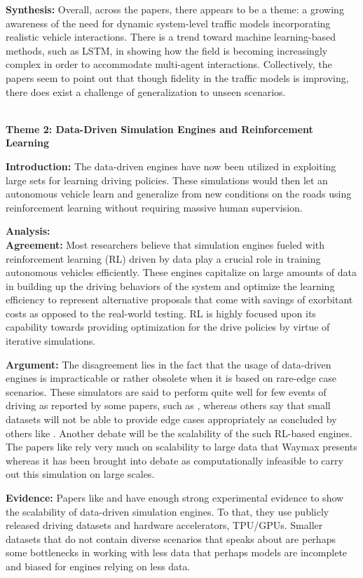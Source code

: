 \documentclass[lettersize,journal]{IEEEtran}
\newcommand{\subsubsubsection}[1]{%
    \par\medskip
    \noindent\textbf{#1}
    \par\medskip
}
\begin{document}
\textbf{Synthesis:}
Overall, across the papers, there appears to be a theme: a growing awareness of the need for dynamic system-level traffic models incorporating realistic vehicle interactions. There is a trend toward machine learning-based methods, such as LSTM, in showing how the field is becoming increasingly complex in order to accommodate multi-agent interactions. Collectively, the papers seem to point out that though fidelity in the traffic models is improving, there does exist a challenge of generalization to unseen scenarios.
\\
\\

\subsubsubsection{Theme 2: Data-Driven Simulation Engines and Reinforcement Learning}
\textbf{Introduction:}
The data-driven engines have now been utilized in exploiting large sets for learning driving policies. These simulations would then let an autonomous vehicle learn and generalize from new conditions on the roads using reinforcement learning without requiring massive human supervision.

\textbf{Analysis:}  \\
\textbf{Agreement:}
Most researchers believe that simulation engines fueled with reinforcement learning (RL) driven by data play a crucial role in training autonomous vehicles efficiently. These engines capitalize on large amounts of data in building up the driving behaviors of the system and optimize the learning efficiency to represent alternative proposals that come with savings of exorbitant costs as opposed to the real-world testing. RL is highly focused upon its capability towards providing optimization for the drive policies by virtue of iterative simulations.

\textbf{Argument:}
The disagreement lies in the fact that the usage of data-driven engines is impracticable or rather obsolete when it is based on rare-edge case scenarios. These simulators are said to perform quite well for few events of driving as reported by some papers, such as \cite{ref5}, whereas others say that small datasets will not be able to provide edge cases appropriately as concluded by others like \cite{ref4}. Another debate will be the scalability of the such RL-based engines. The papers like \cite{ref4} rely very much on scalability to large data that Waymax presents whereas it has been brought into debate as computationally infeasible to carry out this simulation on large scales.


\textbf{Evidence:}
Papers like \cite{ref5} and \cite{ref4} have enough strong experimental evidence to show the scalability of data-driven simulation engines. To that, they use publicly released driving datasets and hardware accelerators, TPU/GPUs. Smaller datasets that do not contain diverse scenarios that \cite{ref5} speaks about are perhaps some bottlenecks in working with less data that perhaps models are incomplete and biased for engines relying on less data.
\end{document}
